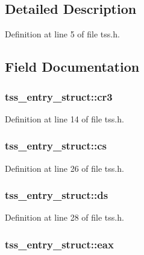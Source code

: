 \subsection{Detailed Description}


Definition at line 5 of file tss.h.



\subsection{Field Documentation}
\hypertarget{structtss__entry__struct_a9e0f9b972f132d019c51e1f4293f91f6}{
\subsubsection[{cr3}]{ {\bf tss\_\-entry\_\-struct::cr3}}}
\label{structtss__entry__struct_a9e0f9b972f132d019c51e1f4293f91f6}


Definition at line 14 of file tss.h.

\hypertarget{structtss__entry__struct_ae3277de62c642df123f25ba86f12af7b}{
\subsubsection[{cs}]{ {\bf tss\_\-entry\_\-struct::cs}}}
\label{structtss__entry__struct_ae3277de62c642df123f25ba86f12af7b}


Definition at line 26 of file tss.h.

\hypertarget{structtss__entry__struct_a9cda3b61ddb5d69bb2622edf0b31a101}{
\subsubsection[{ds}]{ {\bf tss\_\-entry\_\-struct::ds}}}
\label{structtss__entry__struct_a9cda3b61ddb5d69bb2622edf0b31a101}


Definition at line 28 of file tss.h.

\hypertarget{structtss__entry__struct_a4bbfa46a47f7d162a94dc56be12a3676}{
\subsubsection[{eax}]{ {\bf tss\_\-entry\_\-struct::eax}}}
\label{structtss__entry__struct_a4bbfa46a47f7d162a94dc56be12a3676}


